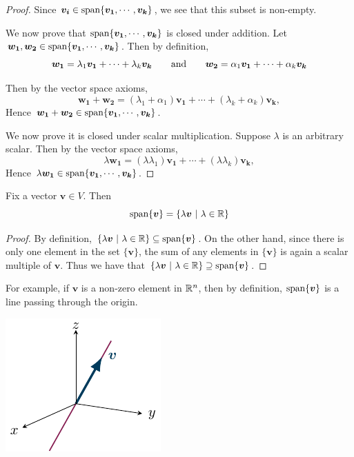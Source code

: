     \begin{proof}
    Since $\bm{v_i} \in \textnormal{span}\{\bm{v_1}, \cdots, \bm{v_k}\}$, we see that this subset is non-empty.
    
    We now prove that $\textnormal{span}\{\bm{v_1}, \cdots, \bm{v_k}\}$ is closed under addition.  Let $\bm{w_1}, \bm{w_2} \in \textnormal{span}\{\bm{v_1}, \cdots, \bm{v_k}\}$.  Then by definition, $$\bm{w_1} = \lambda_1\bm{v_1} + \cdots + \lambda_k\bm{v_k} \qquad \textnormal{and} \qquad \bm{w_2} = \alpha_1\bm{v_1} + \cdots + \alpha_k\bm{v_k}$$
    
    Then by the vector space axioms, $$\bm{w_1} + \bm{w_2} = (\lambda_1+\alpha_1)\bm{v_1} + \cdots + (\lambda_k+\alpha_k)\bm{v_k},$$ Hence $\bm{w_1} + \bm{w_2} \in \textnormal{span}\{\bm{v_1}, \cdots, \bm{v_k}\}$.
    
    We now prove it is closed under scalar multiplication.  Suppose $\lambda$ is an arbitrary scalar.  Then by the vector space axioms, $$\lambda \bm{w_1} = (\lambda\lambda_1)\bm{v_1} + \cdots + (\lambda\lambda_k)\bm{v_k},$$ Hence  $\lambda\bm{w_1} \in \textnormal{span}\{\bm{v_1}, \cdots, \bm{v_k}\}$.
    \end{proof}
    
    \begin{example}
    \begin{proposition}
        Fix a vector $\bm{v} \in V$.  Then $$\textnormal{span}\{\bm{v}\} = \{ \lambda \bm{v} \ | \ \lambda \in \mathbb{R}\}$$
    \end{proposition}
    
    \begin{proof}
    By definition, $\{ \lambda \bm{v} \ | \ \lambda \in \mathbb{R}\} \subseteq \textnormal{span}\{\bm{v}\}$.  On the other hand, since there is only one element in the set $\{\bm{v}\}$, the sum of any elements in $\{\bm{v}\}$ is again a scalar multiple of $\bm{v}$.  Thus we have that $\{ \lambda \bm{v} \ | \ \lambda \in \R\} \supseteq \textnormal{span}\{\bm{v}\}$.
    \end{proof}
    
    
    For example, if $\bm{v}$ is a non-zero element in $\mathbb{R}^n$, then by definition, $\textnormal{span}\{\bm{v}\}$ is a line passing through the origin.

    \begin{center}
    \includegraphics{chapters/1-LinearAlgebra/figures/figures-spanvr3.pdf}        
    \end{center}
    
    \end{example}

